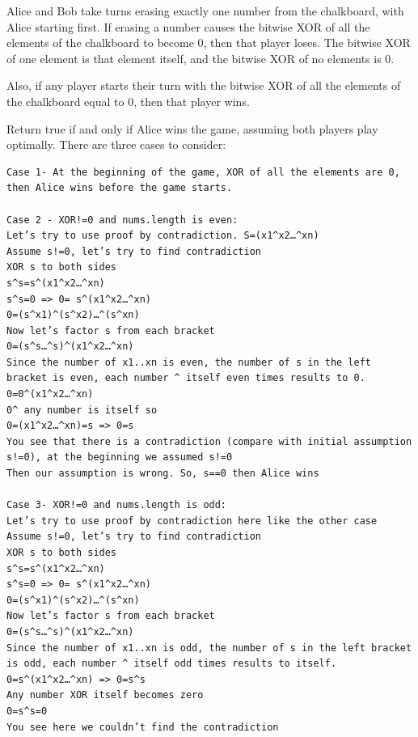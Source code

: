 \documentclass[9pt, b5paaper]{book}
\begin{document}
Alice and Bob take turns erasing exactly one number from the chalkboard, with Alice starting first. If erasing a number causes the bitwise XOR of all the elements of the chalkboard to become 0, then that player loses. The bitwise XOR of one element is that element itself, and the bitwise XOR of no elements is 0.

Also, if any player starts their turn with the bitwise XOR of all the elements of the chalkboard equal to 0, then that player wins.

Return true if and only if Alice wins the game, assuming both players play optimally.
There are three cases to consider:
\begin{verbatim}
Case 1- At the beginning of the game, XOR of all the elements are 0, then Alice wins before the game starts.

Case 2 - XOR!=0 and nums.length is even:
Let’s try to use proof by contradiction. S=(x1^x2…^xn)
Assume s!=0, let’s try to find contradiction
XOR s to both sides
s^s=s^(x1^x2…^xn)
s^s=0 => 0= s^(x1^x2…^xn)
0=(s^x1)^(s^x2)…^(s^xn)
Now let’s factor s from each bracket
0=(s^s…^s)^(x1^x2…^xn)
Since the number of x1..xn is even, the number of s in the left bracket is even, each number ^ itself even times results to 0.
0=0^(x1^x2…^xn)
0^ any number is itself so
0=(x1^x2…^xn)=s => 0=s
You see that there is a contradiction (compare with initial assumption s!=0), at the beginning we assumed s!=0
Then our assumption is wrong. So, s==0 then Alice wins

Case 3- XOR!=0 and nums.length is odd:
Let’s try to use proof by contradiction here like the other case
Assume s!=0, let’s try to find contradiction
XOR s to both sides
s^s=s^(x1^x2…^xn)
s^s=0 => 0= s^(x1^x2…^xn)
0=(s^x1)^(s^x2)…^(s^xn)
Now let’s factor s from each bracket
0=(s^s…^s)^(x1^x2…^xn)
Since the number of x1..xn is odd, the number of s in the left bracket is odd, each number ^ itself odd times results to itself.
0=s^(x1^x2…^xn) => 0=s^s
Any number XOR itself becomes zero
0=s^s=0
You see here we couldn’t find the contradiction
\end{verbatim}
\end{document}
